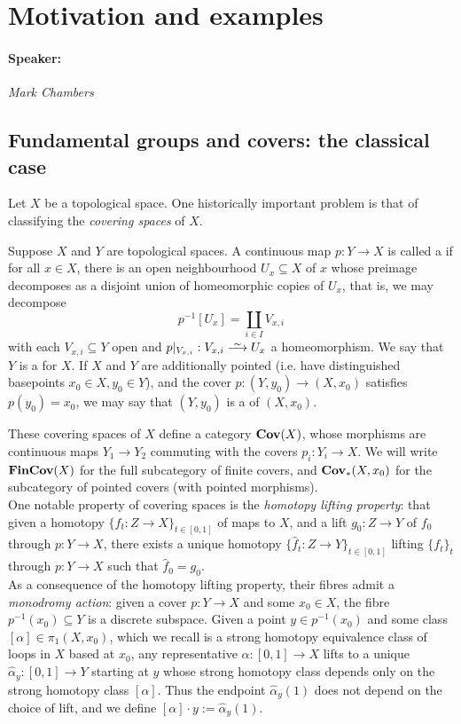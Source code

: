 \section{Motivation and examples}
\label{sec:1_motivation_mark}
\paragraph{Speaker:} \emph{Mark Chambers}
\subsection{Fundamental groups and covers: the classical case}
\label{subsec:1_1_pi1_covers}
Let $X$ be a topological space. One historically important problem is that of classifying the \emph{covering spaces} of $X$.

\begin{defn}
	\label{defn:covering_space}
	Suppose $X$ and $Y$ are topological spaces. A continuous map $p:Y \to X$ is called a  if for all $x \in X$, there is an open neighbourhood $U_x \subseteq X$ of $x$ whose preimage decomposes as a disjoint union of homeomorphic copies of $U_x$, that is, we may decompose
	\[
		p^{-1} [U_x] = \coprod_{i \in I} V_{x, i}
	\]
	with each $V_{x,i} \subseteq Y$ open and $p|_{V_{x,i}} : V_{x,i} \iso U_x$ a homeomorphism. We say that $Y$ is a  for $X$. If $X$ and $Y$ are additionally pointed (i.e. have distinguished basepoints $x_0 \in X, y_0 \in Y$), and the cover $p: (Y, y_0) \to (X, x_0)$ satisfies $p(y_0) = x_0$, we may say that $(Y, y_0)$ is a  of $(X, x_0)$.
\end{defn}

These covering spaces of $X$ define a category $\mathbf{Cov}(X)$, whose morphisms are continuous maps $Y_1 \to Y_2$ commuting with the covers $p_i : Y_i \to X$. We will write $\mathbf{FinCov}(X)$ for the full subcategory of finite covers, and $\mathbf{Cov}_*(X, x_0)$ for the subcategory of pointed covers (with pointed morphisms). \\

One notable property of covering spaces is the \emph{homotopy lifting property}: that given a homotopy $\{f_t :Z \to X\}_{t \in [0,1]}$ of maps to $X$, and a lift $g_0:Z\to Y$ of $f_0$ through $p: Y \to X$, there exists a unique homotopy $\{\hat{f}_t : Z \to Y\}_{t \in [0,1]}$ lifting $\{f_t\}_t$ through $p: Y \to X$ such that $\hat{f}_0 = g_0$. \\

As a consequence of the homotopy lifting property, their fibres admit a \emph{monodromy action}: given a cover $p: Y \to X$ and some $x_0 \in X$, the fibre $p^{-1}(x_0) \subseteq Y$ is a discrete subspace. Given a point $y \in p^{-1}(x_0)$ and some class $[\alpha] \in \pi_1 (X, x_0)$, which we recall is a strong homotopy equivalence class of loops in $X$ based at $x_0$, any representative $\alpha : [0,1] \to X$ lifts to a unique $\hat{\alpha}_y:[0,1] \to Y$ starting at $y$ whose strong homotopy class depends only on the strong homotopy class $[\alpha]$. Thus the endpoint $\hat{\alpha}_y(1)$ does not depend on the choice of lift, and we define $[\alpha] \cdot y := \hat{\alpha}_y(1)$. \\

